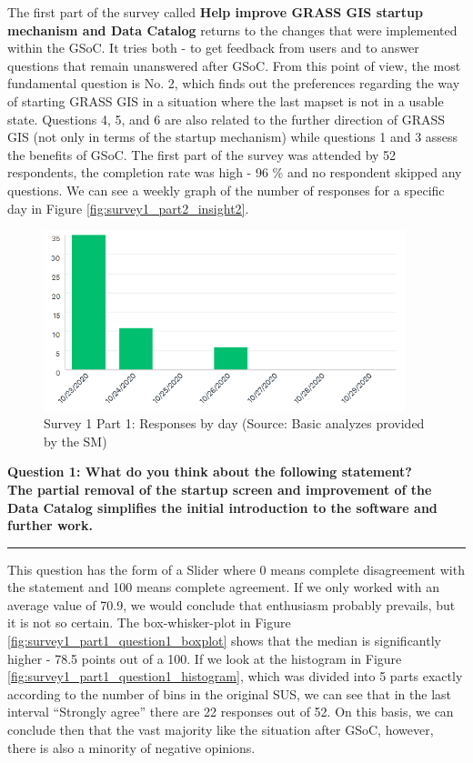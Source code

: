 \documentclass[a4paper,10pt,twoside]{article}
\begin{document}
\noindent The first part of the survey called \textbf {Help improve
  GRASS GIS startup mechanism and Data Catalog} returns to the changes
that were implemented within the GSoC. It tries both - to get feedback
from users and to answer questions that remain unanswered after
GSoC. From this point of view, the most fundamental question is No. 2,
which finds out the preferences regarding the way of starting GRASS
GIS in a situation where the last mapset is not in a usable
state. Questions 4, 5, and 6 are also related to the further direction
of GRASS GIS (not only in terms of the startup mechanism) while
questions 1 and 3 assess the benefits of GSoC. The first part of the
survey was attended by 52 respondents, the completion rate was high -
96 \% and no respondent skipped any questions. We can see a weekly
graph of the number of responses for a specific day in Figure
\ref{fig:survey1_part2_insight2}.

\begin{figure}[hbt!] 
\begin{center}
\includegraphics[width=10.5cm]{../surveys/analyzed_data/survey1_part1_insight2.png} 
\caption[Survey 1 Part 1: Responses by day]{Survey 1 Part 1: Responses by day (Source: Basic analyzes provided by the SM)}
\label{fig:survey1_part1_insight2}
\end{center}
\end{figure}

\newpage
\noindent \textbf{Question 1: What do you think about the following statement? \\
  The partial removal of the startup screen and improvement of the
  Data Catalog simplifies the initial introduction to the software and
  further work.}
\par\noindent\rule{\textwidth}{0.4pt}

\noindent This question has the form of a Slider where 0 means
complete disagreement with the statement and 100 means complete
agreement. If we only worked with an average value of 70.9, we would
conclude that enthusiasm probably prevails, but it is not so
certain. The box-whisker-plot in Figure
\ref{fig:survey1_part1_question1_boxplot} shows that the median is
significantly higher - 78.5 points out of a 100. If we look at the
histogram in Figure \ref{fig:survey1_part1_question1_histogram}, which
was divided into 5 parts exactly according to the number of bins in
the original SUS, we can see that in the last interval ``Strongly
agree'' there are 22 responses out of 52. On this basis, we can
conclude then that the vast majority like the situation after GSoC,
however, there is also a minority of negative opinions.
\end{document}
